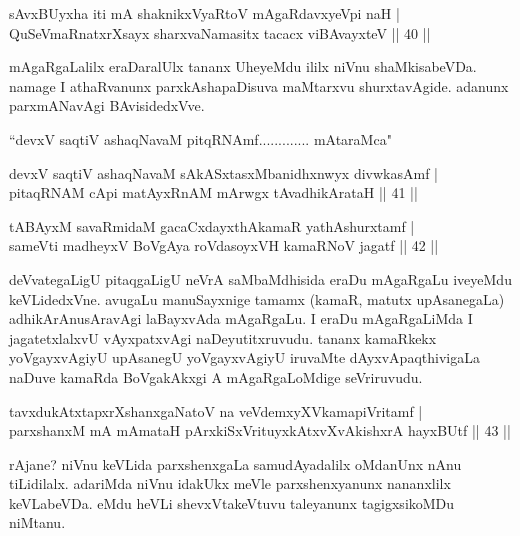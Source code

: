 \begin{shl}
sAvxBUyxha iti mA shaknikxVyaRtoV mAgaRdavxyeV\s pi naH | \\
QuSeVmaRnatxrXsayx sharxvaNamasitx tacacx viBAvayxteV \hfill|| 40 || 
\end{shl}

\begin{artha}
mAgaRgaLalilx eraDaralUlx tananx UheyeMdu ililx niVnu shaMkisabeVDa. 
namage I athaRvanunx parxkAshapaDisuva maMtarxvu shurxtavAgide. 
adanunx parxmANavAgi BAvisidedxVve.
\end{artha}


\begin{shl}
``devxV saqtiV ashaqNavaM pitqRNAmf............. mAtaraMca"
\end{shl}


\begin{shl}
devxV saqtiV ashaqNavaM sAkASxtasxMbanidhxnwyx divwkasAmf | \\
pitaqRNAM cApi matAyxRnAM mArwgx tAvadhikArataH \hfill|| 41 || 
\end{shl}

\begin{shl}
tABAyxM savaRmidaM gacaCxdayxthAkamaR yathAshurxtamf | \\
sameVti madheyxV BoVgAya roVdasoyxVH kamaRNoV jagatf \hfill|| 42 || 
\end{shl}

\begin{artha}
deVvategaLigU pitaqgaLigU neVrA saMbaMdhisida eraDu mAgaRgaLu iveyeMdu 
keVLidedxVne. avugaLu manuSayxnige tamamx (kamaR, matutx upAsanegaLa) 
adhikArAnusAravAgi laBayxvAda mAgaRgaLu. I eraDu mAgaRgaLiMda I 
jagatetxlalxvU vAyxpatxvAgi naDeyutitxruvudu. tananx kamaRkekx 
yoVgayxvAgiyU upAsanegU yoVgayxvAgiyU iruvaMte dAyxvApaqthivigaLa 
naDuve kamaRda BoVgakAkxgi A mAgaRgaLoMdige seVriruvudu.
\end{artha}

\begin{shl}
tavxdukAtxtapxrXshanxgaNatoV na veVdemxyXVkamapiVritamf | \\
parxshanxM mA mAmataH pArxkiSxVrituyxkAtxvX\s vAkishxrA hayxBUtf \hfill|| 43 || 
\end{shl}

\begin{artha}
rAjane? niVnu keVLida parxshenxgaLa samudAyadalilx oMdanUnx nAnu 
tiLidilalx. adariMda niVnu idakUkx meVle parxshenxyanunx nananxlilx 
keVLabeVDa. eMdu heVLi shevxVtakeVtuvu taleyanunx tagigxsikoMDu 
niMtanu.
\end{artha}

